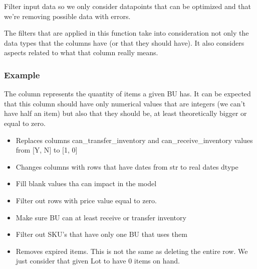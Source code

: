 \documentclass[letterpaper,10pt,english]{sphinxmanual}
\begin{document}
\begin{fulllineitems}
\label{\detokenize{source/optimization.datatools:optimization.datatools.pipelines.clean_data}}
Filter input data so we only consider datapoints that can be optimized and that we’re removing possible data with errors.

The filters that are applied in this function take into consideration
not only the data types that the columns have (or that they should have).
It also considers aspects related to what that column really means.
\subsubsection*{Example}

The column  represents the quantity of items a given BU has.
It can be expected that this column should have only numerical values that are integers
(we can’t have half an item) but also that they should be, at least theoretically bigger
or equal to zero.

\begin{itemize}
\item {} 
 Replaces columns can\_transfer\_inventory and can\_receive\_inventory values from {[}Y, N{]} to {[}1, 0{]}

\item {} 
 Changes columns with rows that have dates from str to real dates dtype

\item {} 
 Fill blank values tha can impact in the model

\item {} 
 Filter out rows with price value equal to zero.

\item {} 
 Make sure BU can at least receive or transfer inventory

\item {} 
 Filter out SKU’s that have only one BU that uses them

\item {} 
 Removes expired items. This is not the same as deleting the entire row. We just consider that given Lot to have 0 items on hand.


\end{itemize}
\end{fulllineitems}
\end{document}
